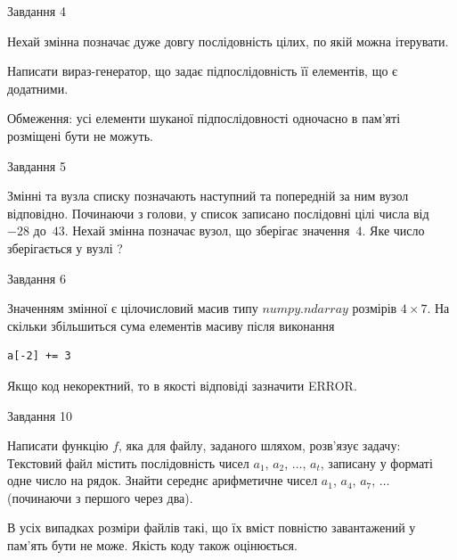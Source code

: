 \documentclass[12pt, ukrainian]{article}
\begin{document}
{               
{\begin{center}Завдання {4}\end{center}}
\vspace{-6mm}
Нехай змінна  позначає дуже довгу послідовність цілих, по якій можна ітерувати.

Написати вираз-генератор, що задає підпослідовність її елементів, що є додатни\-ми.

Обмеження: усі елементи шуканої підпослідовності одночасно в пам'яті розміщені бути не можуть.\par

\vspace{10mm}
               
{\begin{center}Завдання {5}\end{center}}
\vspace{-6mm}
Змінні  та  вузла списку позначають наступний та попередній за ним вузол відповідно. Починаючи з голови, у список записано послідовні цілі числа від~$-28$ до~$43$. Нехай змінна  позначає вузол, що зберігає значення~$4$.
Яке число зберігається у вузлі  ?\par

               
{\begin{center}Завдання {6}\end{center}}
\vspace{-6mm}
Значенням змінної  є цілочисловий масив типу $numpy.ndarray$ розмірів $4{\times}7$. На скільки збільшиться сума елементів масиву  після виконання
\begin{verbatim}
a[-2] += 3
\end{verbatim}


Якщо код некоректний, то в якості відповіді зазначити ERROR.\par

               
{\begin{center}Завдання {10}\end{center}}
\vspace{-6mm}

Написати функцію $f$, яка для файлу, заданого шляхом, розв’язує задачу:\\ Текстовий файл містить послідовність чисел $a_1$, $a_2$, $\ldots$, $a_t$, записану у форматі одне число на рядок. Знайти середнє арифметичне чисел $a_1$, $a_4$, $a_7$, $\ldots$ (починаючи з першого через два).

В усіх випадках розміри файлів такі, що їх вміст повністю завантажений у пам'ять бути не може. Якість коду також оцінюється.



}
\end{document}

